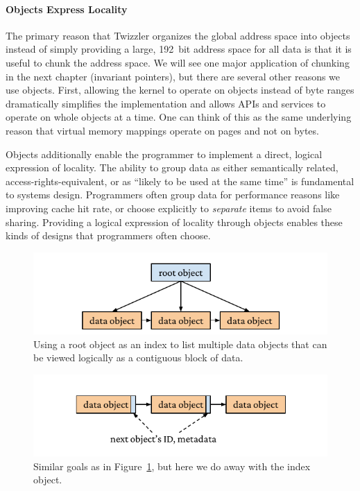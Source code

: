 \paragraph{Objects Express Locality}
The primary reason that Twizzler organizes the global address space into objects instead of simply providing a large,
192~bit address space for all data is that it is useful to chunk the address space. We will see one major application of
chunking in the next chapter (invariant pointers), but there are several other reasons we use objects. First, allowing
the kernel to operate on objects instead of byte ranges dramatically simplifies the implementation and allows APIs and
services to operate on whole objects at a time. One can think of this as the same underlying reason that virtual memory
mappings operate on pages and not on bytes.

Objects additionally enable the programmer to implement a direct, logical expression of locality.
The ability to group data as either semantically related, access-rights-equivalent, or as ``likely to be used at the
same time'' is fundamental to systems design. Programmers often group data for performance reasons like improving cache
hit rate, or choose explicitly to \emph{separate} items to avoid false sharing. Providing a logical expression of
locality through objects enables these kinds of designs that programmers often choose.
\begin{figure}
    \centering
    \includegraphics[width=\linewidth]{fig/objectchain1.pdf}
    \caption[Chaining objects]{Using a root object as an index to list multiple data objects that can be viewed logically as a contiguous block of data.}
    \label{fig:objchain1}
\end{figure}

\begin{figure}
    \centering
    \includegraphics[width=\linewidth]{fig/objectchain2.pdf}
    \caption[Alternative object chaining]{Similar goals as in Figure~\ref{fig:objchain1}, but here we do away with the index object.}
    \label{fig:objchain2}
\end{figure}
